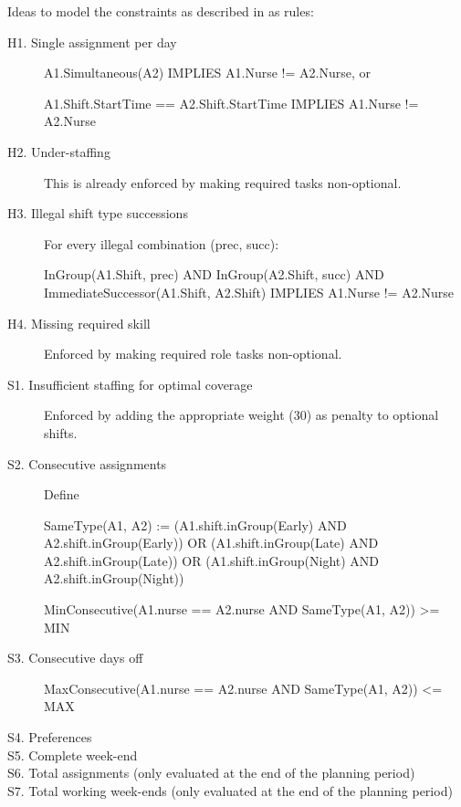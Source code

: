 Ideas to model the constraints as described in \cite{ceschia2019second} as rules:
\begin{description}
\item[H1. Single assignment per day]

A1.Simultaneous(A2) IMPLIES A1.Nurse != A2.Nurse, or

A1.Shift.StartTime == A2.Shift.StartTime IMPLIES A1.Nurse != A2.Nurse

\item[H2. Under-staffing]
This is already enforced by making required tasks non-optional.

\item[H3. Illegal shift type successions]
For every illegal combination (prec, succ):

InGroup(A1.Shift, prec) AND InGroup(A2.Shift, succ) AND ImmediateSuccessor(A1.Shift, A2.Shift) IMPLIES A1.Nurse != A2.Nurse

\item[H4. Missing required skill]
Enforced by making required role tasks non-optional.

\item[S1. Insufficient staffing for optimal coverage]
Enforced by adding the appropriate weight (30) as penalty to optional shifts.

\item[S2. Consecutive assignments]

Define 

SameType(A1, A2) := (A1.shift.inGroup(Early) AND A2.shift.inGroup(Early)) OR (A1.shift.inGroup(Late) AND A2.shift.inGroup(Late)) OR (A1.shift.inGroup(Night) AND A2.shift.inGroup(Night))

MinConsecutive(A1.nurse == A2.nurse AND SameType(A1, A2)) >= MIN

\item[S3. Consecutive days off]

MaxConsecutive(A1.nurse == A2.nurse AND SameType(A1, A2)) <= MAX

\item[S4. Preferences]

\item[S5. Complete week-end]

\item[S6. Total assignments (only evaluated at the end of the planning period)]

\item[S7. Total working week-ends (only evaluated at the end of the planning period)]


\end{description}

